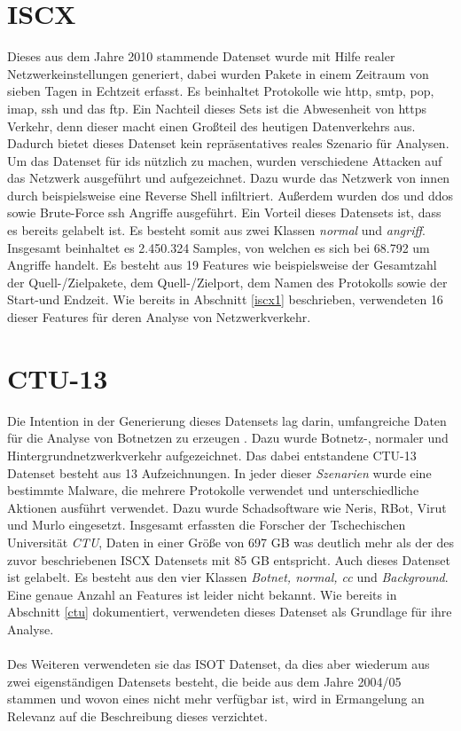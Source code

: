 \documentclass[
    12pt, %
    DIV10,
    ngerman, %
    a4paper, %
    oneside, %
    titlepage, %
    parskip=half, %
    headings=normal, %
    listof=totoc, %
    bibliography=totoc, %
    index=totoc, %
    captions=tableheading, %
    final %
]{scrreprt}
\begin{document}
\section{ISCX}
Dieses aus dem Jahre 2010 stammende Datenset wurde mit Hilfe realer Netzwerkeinstellungen generiert, dabei wurden Pakete in einem Zeitraum von sieben Tagen in Echtzeit erfasst. Es beinhaltet Protokolle wie \ac{http}, \ac{smtp}, \ac{pop}, \ac{imap}, \ac{ssh} und das \ac{ftp}. Ein Nachteil dieses Sets ist die Abwesenheit von \ac{https} Verkehr, denn dieser macht einen Gro{\ss}teil des heutigen Datenverkehrs aus. Dadurch bietet dieses Datenset kein repräsentatives reales Szenario für Analysen. Um das Datenset für \ac{ids} nützlich zu machen, wurden verschiedene Attacken auf das Netzwerk ausgeführt und aufgezeichnet. Dazu wurde das Netzwerk von innen durch beispielsweise eine Reverse Shell infiltriert. Au{\ss}erdem wurden \ac{dos} und \ac{ddos} sowie Brute-Force \ac{ssh} Angriffe ausgeführt. Ein Vorteil dieses Datensets ist, dass es bereits gelabelt ist. Es besteht somit aus zwei Klassen \emph{normal} und \emph{angriff}. Insgesamt beinhaltet es 2.450.324 Samples, von welchen es sich bei 68.792 um Angriffe handelt. Es besteht aus 19 Features wie beispielsweise der Gesamtzahl der Quell-/Zielpakete, dem Quell-/Zielport, dem Namen des Protokolls sowie der Start-und Endzeit. Wie bereits in Abschnitt \ref{iscx1} beschrieben, verwendeten \textcite{Aldwairi2018} 16 dieser Features für deren Analyse von Netzwerkverkehr.
\section{CTU-13}
Die Intention in der Generierung dieses Datensets lag darin, umfangreiche Daten für die Analyse von Botnetzen zu erzeugen \parencite{garcia2014empirical}. Dazu wurde Botnetz-, normaler und Hintergrundnetzwerkverkehr aufgezeichnet. Das dabei entstandene CTU-13 Datenset besteht aus 13 Aufzeichnungen. In jeder dieser \emph{Szenarien} wurde eine bestimmte Malware, die mehrere Protokolle verwendet und unterschiedliche Aktionen ausführt verwendet. Dazu wurde Schadsoftware wie Neris, RBot, Virut und Murlo eingesetzt. Insgesamt erfassten die Forscher der Tschechischen Universität \emph{CTU}, Daten in einer Grö{\ss}e von 697 GB was deutlich mehr als der des zuvor beschriebenen ISCX Datensets mit 85 GB entspricht. Auch dieses Datenset ist gelabelt. Es besteht aus den vier Klassen \emph{Botnet, normal, \ac{cc}} und \emph{Background}. Eine genaue Anzahl an Features ist leider nicht bekannt.
Wie bereits in Abschnitt \ref{ctu} dokumentiert, verwendeten \textcite{Mathur2018} dieses Datenset als Grundlage für ihre Analyse.\\\\
Des Weiteren verwendeten sie das ISOT Datenset, da dies aber wiederum aus zwei eigenständigen Datensets besteht, die beide aus dem Jahre 2004/05 stammen und wovon eines nicht mehr verfügbar ist, wird in Ermangelung an Relevanz auf die Beschreibung dieses verzichtet.
\end{document}
